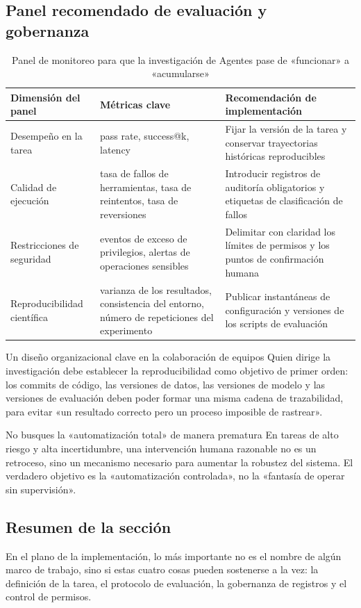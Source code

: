 \subsection{Panel recomendado de evaluación y gobernanza}
\begin{table}[H]
\centering
\begin{tabular}{p{2.8cm}p{4.1cm}p{4.6cm}}
\toprule
\textbf{Dimensión del panel} & \textbf{Métricas clave} & \textbf{Recomendación de implementación} \\
\midrule
Desempeño en la tarea & pass rate, success@k, latency & Fijar la versión de la tarea y conservar trayectorias históricas reproducibles \\
Calidad de ejecución & tasa de fallos de herramientas, tasa de reintentos, tasa de reversiones & Introducir registros de auditoría obligatorios y etiquetas de clasificación de fallos \\
Restricciones de seguridad & eventos de exceso de privilegios, alertas de operaciones sensibles & Delimitar con claridad los límites de permisos y los puntos de confirmación humana \\
Reproducibilidad científica & varianza de los resultados, consistencia del entorno, número de repeticiones del experimento & Publicar instantáneas de configuración y versiones de los scripts de evaluación \\
\bottomrule
\end{tabular}
\caption{Panel de monitoreo para que la investigación de Agentes pase de «funcionar» a «acumularse»}
\end{table}

\begin{knowledgebox}{Un diseño organizacional clave en la colaboración de equipos}
Quien dirige la investigación debe establecer la reproducibilidad como objetivo de primer orden:
los commits de código, las versiones de datos, las versiones de modelo y las versiones de evaluación deben poder formar una misma cadena de trazabilidad, para evitar «un resultado correcto pero un proceso imposible de rastrear».
\end{knowledgebox}

\begin{warningbox}{No busques la «automatización total» de manera prematura}
En tareas de alto riesgo y alta incertidumbre, una intervención humana razonable no es un retroceso, sino un mecanismo necesario para aumentar la robustez del sistema.
El verdadero objetivo es la «automatización controlada», no la «fantasía de operar sin supervisión».
\end{warningbox}

\subsection{Resumen de la sección}
En el plano de la implementación, lo más importante no es el nombre de algún marco de trabajo, sino si estas cuatro cosas pueden sostenerse a la vez: la definición de la tarea, el protocolo de evaluación, la gobernanza de registros y el control de permisos.


